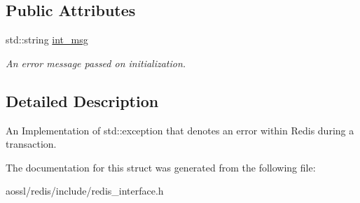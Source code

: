 \subsection*{Public Attributes}
\begin{DoxyCompactItemize}
\item 
std\+::string \hyperlink{structRedisOperationException_ac5deeab2028bb95e7db928cfb222656e}{int\+\_\+msg}\hypertarget{structRedisOperationException_ac5deeab2028bb95e7db928cfb222656e}{}\label{structRedisOperationException_ac5deeab2028bb95e7db928cfb222656e}

\begin{DoxyCompactList}\small\item\em An error message passed on initialization. \end{DoxyCompactList}\end{DoxyCompactItemize}


\subsection{Detailed Description}
An Implementation of std\+::exception that denotes an error within Redis during a transaction. 

The documentation for this struct was generated from the following file\+:\begin{DoxyCompactItemize}
\item 
aossl/redis/include/redis\+\_\+interface.\+h\end{DoxyCompactItemize}
